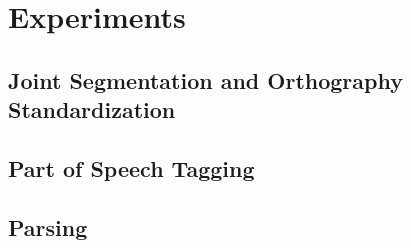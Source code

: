 \chapter{Experiments}

\section{Joint Segmentation and Orthography Standardization}

\section{Part of Speech Tagging}

\section{Parsing}
